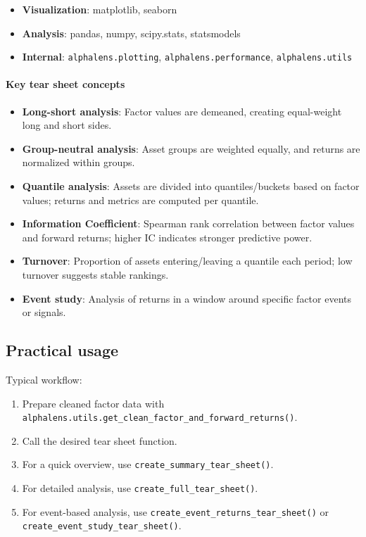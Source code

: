 \documentclass[11pt]{article}
\begin{document}
\begin{itemize}
  \item \textbf{Visualization}: matplotlib, seaborn
  \item \textbf{Analysis}: pandas, numpy, scipy.stats, statsmodels
  \item \textbf{Internal}: \texttt{alphalens.plotting}, \texttt{alphalens.performance}, \texttt{alphalens.utils}
\end{itemize}

\paragraph{Key tear sheet concepts}
\begin{itemize}
  \item \textbf{Long-short analysis}: Factor values are demeaned, creating equal-weight long and short sides.
  \item \textbf{Group-neutral analysis}: Asset groups are weighted equally, and returns are normalized within groups.
  \item \textbf{Quantile analysis}: Assets are divided into quantiles/buckets based on factor values; returns and metrics are computed per quantile.
  \item \textbf{Information Coefficient}: Spearman rank correlation between factor values and forward returns; higher IC indicates stronger predictive power.
  \item \textbf{Turnover}: Proportion of assets entering/leaving a quantile each period; low turnover suggests stable rankings.
  \item \textbf{Event study}: Analysis of returns in a window around specific factor events or signals.
\end{itemize}

\subsection{Practical usage}

Typical workflow:

\begin{enumerate}
  \item Prepare cleaned factor data with \texttt{alphalens.utils.get\_clean\_factor\_and\_forward\_returns()}.
  \item Call the desired tear sheet function.
  \item For a quick overview, use \texttt{create\_summary\_tear\_sheet()}.
  \item For detailed analysis, use \texttt{create\_full\_tear\_sheet()}.
  \item For event-based analysis, use \texttt{create\_event\_returns\_tear\_sheet()} or \texttt{create\_event\_study\_tear\_sheet()}.
\end{enumerate}
\end{document}
